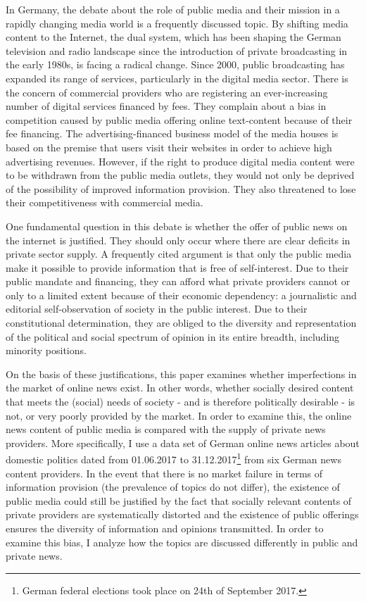\documentclass[12pt,a4paper,notitlepage]{article}
\begin{document}
In Germany, the debate about the role of public media and their mission in a rapidly changing media world is a frequently discussed topic. By shifting media content to the Internet, the dual system, which has been shaping the German television and radio landscape since the introduction of private broadcasting in the early 1980s, is facing a radical change. Since 2000, public broadcasting has expanded its range of services, particularly in the digital media sector. There is the concern of commercial providers who are registering an ever-increasing number of digital services financed by fees. They complain about a bias in competition caused by public media offering online text-content because of their fee financing. The advertising-financed business model of the media houses is based on the premise that users visit their websites in order to achieve high advertising revenues. However, if the right to produce digital media content were to be withdrawn from the public media outlets, they would not only be deprived of the possibility of improved information provision. They also threatened to lose their competitiveness with commercial media.

One fundamental question in this debate is whether the offer of public news on the internet is justified. They should only occur where there are clear deficits in private sector supply. A frequently cited argument is that only the public media make it possible to provide information that is free of self-interest. Due to their public mandate and financing, they can afford what private providers cannot or only to a limited extent because of their economic dependency: a journalistic and editorial self-observation of society in the public interest. Due to their constitutional determination, they are obliged to the diversity and representation of the political and social spectrum of opinion in its entire breadth, including minority positions.

On the basis of these justifications, this paper examines whether imperfections in the market of online news exist. In other words, whether socially desired content that meets the (social) needs of society - and is therefore politically desirable - is not, or very poorly provided by the market. In order to examine this, the online news content of public media is compared with the supply of private news providers. More specifically, I use a data set of German online news articles about domestic politics dated from 01.06.2017 to 31.12.2017\footnote{German federal elections took place on 24th of September 2017.} from six German news content providers. In the event that there is no market failure in terms of information provision (the prevalence of topics do not differ), the existence of public media could still be justified by the fact that socially relevant contents of private providers are systematically distorted and the existence of public offerings ensures the diversity of information and opinions transmitted. In order to examine this bias, I analyze how the topics are discussed differently in public and private news.
\end{document}
